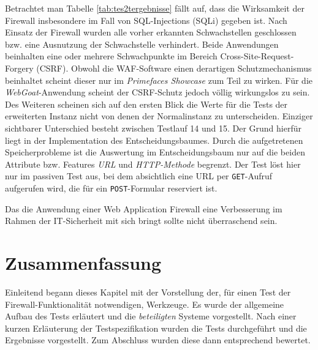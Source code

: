 Betrachtet man Tabelle \ref{tab:tes2tergebnisse} fällt auf, dass die Wirksamkeit der Firewall insbesondere im Fall von SQL-Injections (SQLi) gegeben ist. Nach Einsatz der Firewall wurden alle vorher erkannten Schwachstellen geschlossen bzw. eine Ausnutzung der Schwachstelle verhindert. Beide Anwendungen beinhalten eine oder mehrere Schwachpunkte im Bereich Cross-Site-Request-Forgery (CSRF). Obwohl die WAF-Software einen derartigen Schutzmechanismus beinhaltet scheint dieser nur im \emph{Primefaces Showcase} zum Teil zu wirken. Für die \emph{WebGoat}-Anwendung scheint der CSRF-Schutz jedoch völlig wirkungslos zu sein.\\
Des Weiteren scheinen sich auf den ersten Blick die Werte für die Tests der erweiterten Instanz nicht von denen der Normalinstanz zu unterscheiden. Einziger sichtbarer Unterschied besteht zwischen Testlauf 14 und 15. Der Grund hierfür liegt in der Implementation des Entscheidungsbaumes. Durch die aufgetretenen Speicherprobleme ist die Auswertung im Entscheidungsbaum nur auf die beiden Attribute bzw. Features \emph{URL} und \emph{HTTP-Methode} begrenzt. Der Test löst hier nur im passiven Test aus, bei dem absichtlich eine URL per \verb=GET=-Aufruf aufgerufen wird, die für ein \verb=POST=-Formular reserviert ist.


Das die Anwendung einer Web Application Firewall eine Verbesserung im Rahmen der IT-Sicherheit mit sich bringt sollte nicht überraschend sein.







\section{Zusammenfassung}

Einleitend begann dieses Kapitel mit der Vorstellung der, für einen Test der Firewall-Funktionalität notwendigen, Werkzeuge. Es wurde der allgemeine Aufbau des Tests erläutert und die \emph{beteiligten} Systeme vorgestellt. Nach einer kurzen Erläuterung der Testspezifikation wurden die Tests durchgeführt und die Ergebnisse vorgestellt. Zum Abschluss wurden diese dann entsprechend bewertet.


